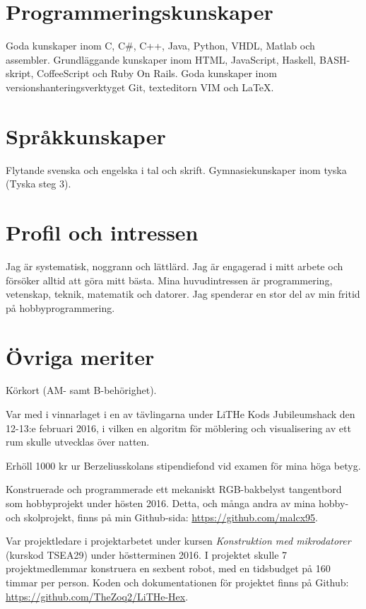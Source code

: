 \documentclass[a4paper,notitlepage]{article}
\begin{document}

\section*{Programmeringskunskaper}
Goda kunskaper inom C, C\#, C++, Java, Python, VHDL, Matlab och assembler.
Grundläggande kunskaper inom HTML, JavaScript, Haskell, BASH-skript,
CoffeeScript och Ruby On Rails. Goda kunskaper inom versionshanteringsverktyget Git, texteditorn VIM och LaTeX.

\section*{Språkkunskaper}
Flytande svenska och engelska i tal och skrift. Gymnasiekunskaper inom tyska
(Tyska steg 3).

\section*{Profil och intressen}
Jag är systematisk, noggrann och lättlärd. Jag är engagerad i mitt arbete och
försöker alltid att göra mitt bästa. Mina huvudintressen är programmering, vetenskap, 
teknik, matematik och datorer. Jag spenderar en stor del av min fritid på
hobbyprogrammering.

\section*{Övriga meriter}
Körkort (AM- samt B-behörighet).

Var med i vinnarlaget i en av tävlingarna under LiTHe Kods Jubileumshack den
12-13:e februari 2016, i vilken en algoritm för möblering och visualisering av 
ett rum skulle utvecklas över natten.

Erhöll 1000 kr ur Berzeliusskolans stipendiefond vid examen för mina höga
betyg.

Konstruerade och programmerade ett mekaniskt RGB-bakbelyst tangentbord som
hobbyprojekt under hösten 2016. Detta, och många andra av mina hobby- och skolprojekt, finns på min Github-sida: \url{https://github.com/malcx95}.

Var projektledare i projektarbetet under kursen \textit{Konstruktion med
mikrodatorer} (kurskod TSEA29) under höstterminen 2016.
I projektet skulle 7 projektmedlemmar
konstruera en sexbent robot, med en tidsbudget på 160 timmar per person. Koden
och dokumentationen för projektet finns på Github:
\url{https://github.com/TheZoq2/LiTHe-Hex}.
\end{document}
